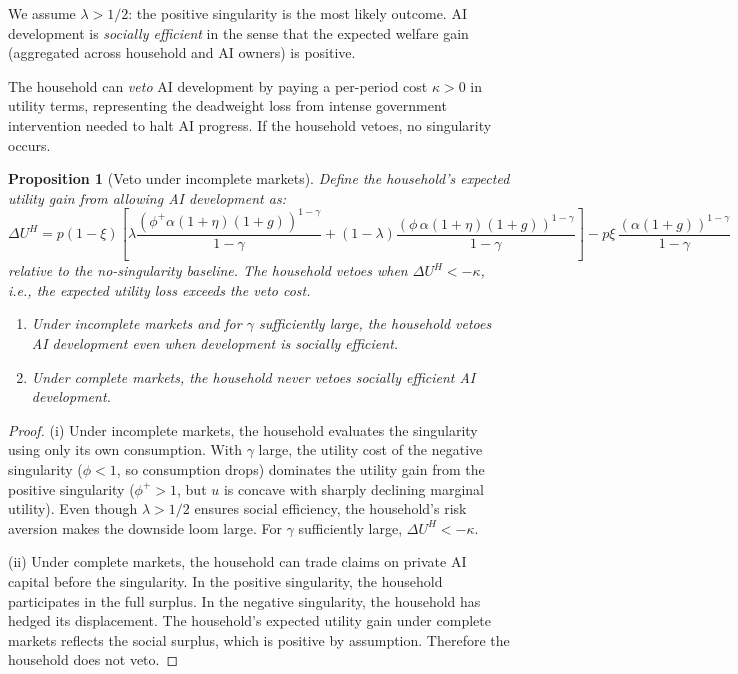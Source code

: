 \documentclass[12pt]{article}
\newtheorem{proposition}{Proposition}
\begin{document}
\noindent We assume $\lambda > 1/2$: the positive singularity is the most likely outcome. AI development is \emph{socially efficient} in the sense that the expected welfare gain (aggregated across household and AI owners) is positive.

The household can \emph{veto} AI development by paying a per-period cost $\kappa > 0$ in utility terms, representing the deadweight loss from intense government intervention needed to halt AI progress. If the household vetoes, no singularity occurs.

\begin{proposition}[Veto under incomplete markets] \label{prop:veto} %
Define the household's expected utility gain from allowing AI development as:
%
\begin{equation}
\Delta U^H = p(1-\xi) \left[ \lambda \frac{(\phi^+ \alpha (1+\eta)(1+g))^{1-\gamma}}{1-\gamma} + (1-\lambda) \frac{(\phi \, \alpha (1+\eta)(1+g))^{1-\gamma}}{1-\gamma} \right] - p\xi \, \frac{(\alpha(1+g))^{1-\gamma}}{1-\gamma} \label{eq:veto-gain}
\end{equation}
%
relative to the no-singularity baseline. The household vetoes when $\Delta U^H < -\kappa$, i.e., the expected utility loss exceeds the veto cost.

\begin{enumerate}
\item[(i)] Under incomplete markets and for $\gamma$ sufficiently large, the household vetoes AI development even when development is socially efficient.
\item[(ii)] Under complete markets, the household never vetoes socially efficient AI development.
\end{enumerate}
\end{proposition}

\begin{proof}
(i) Under incomplete markets, the household evaluates the singularity using only its own consumption. With $\gamma$ large, the utility cost of the negative singularity ($\phi < 1$, so consumption drops) dominates the utility gain from the positive singularity ($\phi^+ > 1$, but $u$ is concave with sharply declining marginal utility). Even though $\lambda > 1/2$ ensures social efficiency, the household's risk aversion makes the downside loom large. For $\gamma$ sufficiently large, $\Delta U^H < -\kappa$.

(ii) Under complete markets, the household can trade claims on private AI capital before the singularity. In the positive singularity, the household participates in the full surplus. In the negative singularity, the household has hedged its displacement. The household's expected utility gain under complete markets reflects the social surplus, which is positive by assumption. Therefore the household does not veto.
\end{proof}
\end{document}
